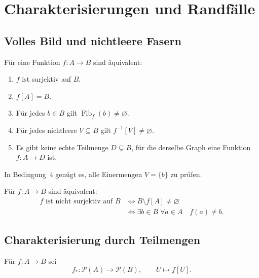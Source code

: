 \chapter{Charakterisierungen und Randfälle}
\label{b07guide:ch:criteria}

\section{Volles Bild und nichtleere Fasern}

\begin{theorem}
\label{b07guide:thm:pointcriteria}
Für eine Funktion $f\colon A\to B$ sind äquivalent:
\begin{enumerate}
\item $f$ ist surjektiv auf $B$.
\item $f[A]=B$.
\item Für jedes $b\in B$ gilt $\operatorname{Fib}_f(b)\ne\varnothing$.
\item Für jedes nichtleere $V\subseteq B$ gilt
      $f^{-1}[V]\ne\varnothing$.
\item Es gibt keine echte Teilmenge $D\subsetneq B$,
      für die derselbe Graph eine Funktion $f\colon A\to D$ ist.
\end{enumerate}
In Bedingung~4 genügt es, alle Einermengen $V=\{b\}$ zu prüfen.
\end{theorem}

\begin{theorem}
\label{b07guide:thm:failure}
Für $f\colon A\to B$ sind äquivalent:
\[
 \begin{aligned}
 f\text{ ist nicht surjektiv auf }B
 &\Longleftrightarrow B\setminus f[A]\ne\varnothing\\
 &\Longleftrightarrow
   \exists b\in B\;\forall a\in A\quad f(a)\ne b.
 \end{aligned}
\]
\end{theorem}

\section{Charakterisierung durch Teilmengen}

\begin{definition}
Für $f\colon A\to B$ sei
\[
 f_*\colon\mathcal P(A)\to\mathcal P(B),
 \qquad U\mapsto f[U].
\]
\end{definition}

